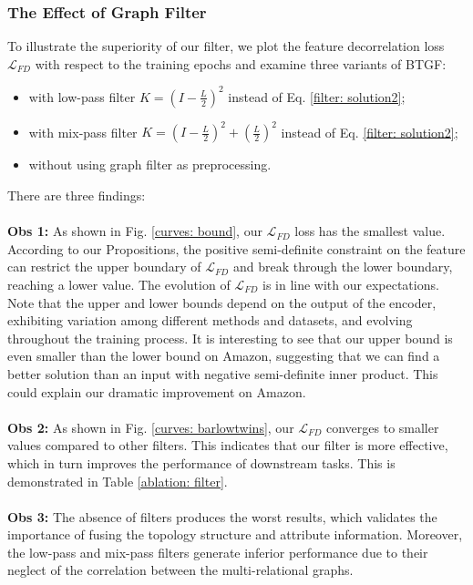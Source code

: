 \documentclass[letterpaper]{article} %
\begin{document}
\subsubsection{The Effect of Graph Filter}
To illustrate the superiority of our filter, we plot the feature decorrelation loss $\mathcal{L}_{FD}$ with respect to the training epochs and examine three variants of BTGF:
\begin{itemize}
    \item with low-pass filter $K = (I-\frac{L}{2})^2 $ instead of Eq. \ref{filter: solution2};
    \item with mix-pass filter $K = (I-\frac{L}{2})^2 + (\frac{L}{2})^2$ instead of Eq. \ref{filter: solution2};
    \item without using graph filter as preprocessing.
\end{itemize}
There are three findings:\\
\\
\textbf{Obs 1:} As shown in Fig. \ref{curves: bound}, our $\mathcal{L}_{FD}$ loss has the smallest value. According to our Propositions, the positive semi-definite constraint on the feature can restrict the upper boundary of $\mathcal{L}_{FD}$ and break through the lower boundary, reaching a lower value. The evolution of $\mathcal{L}_{FD}$ is in line with our expectations. Note that the upper and lower bounds depend on the output of the encoder, exhibiting variation among different methods and datasets, and evolving throughout the training process. It is interesting to see that our upper bound is even smaller than the lower bound on Amazon, suggesting that we can find a better solution than an input with negative semi-definite inner product. This could explain our dramatic improvement on Amazon.\\
\\
\textbf{Obs 2:} As shown in Fig. \ref{curves: barlowtwins}, our $\mathcal{L}_{FD}$ converges to smaller values compared to other filters. This indicates that our filter is more effective, which in turn improves the performance of downstream tasks. This is demonstrated in Table \ref{ablation: filter}. \\ 
\\
\textbf{Obs 3:} The absence of filters produces the worst results, which validates the importance of fusing the topology structure and attribute information. Moreover, the low-pass and mix-pass filters generate inferior performance due to their neglect of the correlation between the multi-relational graphs.
\end{document}
